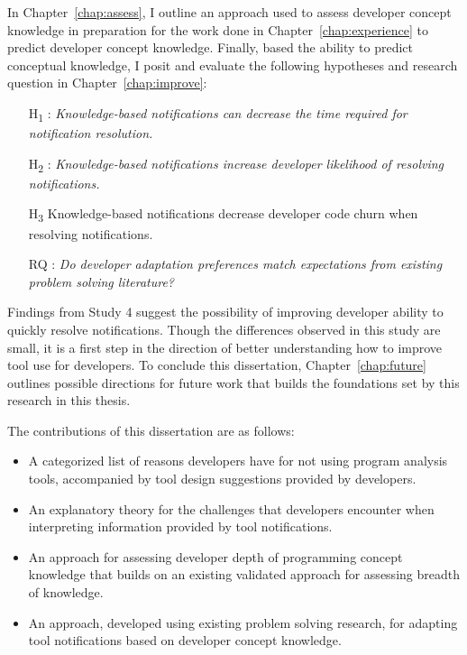 In Chapter~\ref{chap:assess}, I outline an approach used to assess developer concept knowledge in preparation for the work done in Chapter~\ref{chap:experience} to predict developer concept knowledge.
Finally, based the ability to predict conceptual knowledge, I posit and evaluate the following hypotheses and research question in Chapter~\ref{chap:improve}:
\begin{itemize}
    \item [H\textsubscript{1}]: \textit{Knowledge-based notifications can decrease the time required for notification resolution.}
    \item [H\textsubscript{2}]: \textit{Knowledge-based notifications increase developer likelihood of resolving notifications. }
    \item [H\textsubscript{3}] Knowledge-based notifications decrease developer code churn when resolving notifications.
    \item[RQ]: \textit{Do developer adaptation preferences match expectations from existing problem solving literature?}
\end{itemize}

Findings from Study 4 suggest the possibility of improving developer ability to quickly resolve notifications. Though the differences observed in this study are small, it is a first step in the direction of better understanding how to improve tool use for developers. To conclude this dissertation, Chapter~\ref{chap:future} outlines possible directions for future work that builds the foundations set by this research in this thesis.

The contributions of this dissertation are as follows:
\begin{itemize}
    \item A categorized list of reasons developers have for not using program analysis tools, accompanied by tool design suggestions provided by developers.
    \item An explanatory theory for the challenges that developers encounter when interpreting information provided by tool notifications.
    \item An approach for assessing developer depth of programming concept knowledge that builds on an existing validated approach for assessing breadth of knowledge.
    \item An approach, developed using existing problem solving research, for adapting tool notifications based on developer concept knowledge.
\end{itemize}

